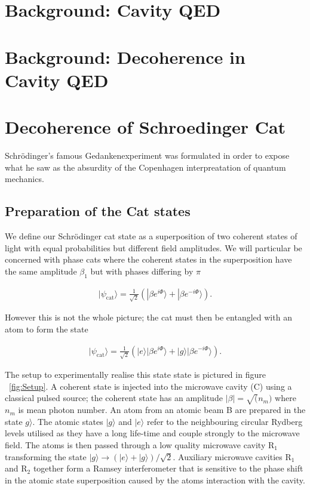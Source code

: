 \documentclass[aps,prl,twocolumn,amsmath,amssymb]{revtex4}
\begin{document}
\section{\label{sec:level2}Background: Cavity QED}

\section{\label{sec:level1}Background: Decoherence in Cavity QED}

\section{\label{sec:level1}Decoherence of Schroedinger Cat}

Schrödinger's famous Gedankenexperiment was formulated in order to expose what he saw as the absurdity of the Copenhagen interpreatation of quantum mechanics.  

\subsection{\label{sec:level1}Preparation of the Cat states}


We define our Schrödinger cat state as a superposition of two coherent states of light with equal probabilities but different field amplitudes. We will particular be concerned with phase cats where the coherent states in the superposition have the same amplitude $\beta_1$ but with phases differing by $\pi$

\begin{align}
|\psi_{\mathrm{cat}}\rangle = \frac{1}{\sqrt{2}} (|\beta e^{i\Phi}\rangle+|\beta e^{-i\Phi}\rangle)
\label{eq:cat1}.
\end{align}

However this is not the whole picture; the cat must then be entangled with an atom to form the state

\begin{align}
|\psi_{\mathrm{cat}}\rangle = \frac{1}{\sqrt{2}} (|e\rangle|\beta e^{i\Phi}\rangle+|g\rangle|\beta e^{-i\Phi}\rangle)
\label{eq:cat2}.
\end{align}

The setup to experimentally realise this state state is pictured in figure ~\ref{fig:Setup}. A coherent state is injected into the microwave cavity (C) using a classical pulsed source; the coherent state has an amplitude $|\beta| = \sqrt(n_{m})$ where $n_{m}$ is mean photon number. An atom from an atomic beam B are prepared in the state $g\rangle$. The atomic states $|g\rangle$ and $|e\rangle$ refer to the neighbouring circular Rydberg levels utilised as they have a long life-time and couple strongly to the microwave field.  The atoms is then passed through a low quality microwave cavity $\mathrm{R_{1}}$ transforming the state $|g\rangle \rightarrow  (|e\rangle+|g\rangle)/\sqrt{2}$. Auxiliary microwave cavities $\mathrm{R_{1}}$ and $\mathrm{R_{2}}$ together form a Ramsey interferometer that is sensitive to the phase shift in the atomic state superposition caused by the atoms interaction with the cavity. 
\end{document}

